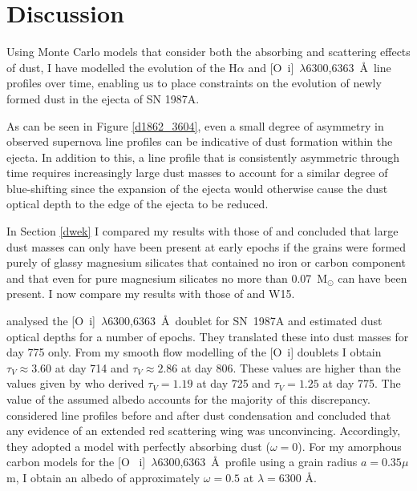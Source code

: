 \section{Discussion}
\label{discuss}

Using Monte Carlo models that consider both the absorbing and scattering 
effects of dust, I have modelled the evolution of the H$\alpha$ and 
[O~{\sc i}]~$\lambda$6300,6363~\AA\ line profiles over time, enabling us 
to place constraints on the evolution of newly formed dust in the ejecta 
of SN 1987A.

As can be seen in Figure \ref{d1862_3604}, even a small degree of 
asymmetry in observed supernova line profiles can be indicative of dust 
formation within the ejecta.  In addition to this, a line profile that is 
consistently asymmetric through time requires increasingly large dust 
masses to account for a similar degree of blue-shifting since the 
expansion of the ejecta would otherwise cause the dust optical depth to 
the edge of the ejecta to be reduced.

In Section \ref{dwek} I compared my results with those of \citet{Dwek2015} and 
concluded that large dust masses can only have been present at early 
epochs if the grains were formed purely of glassy magnesium silicates that 
contained no iron or carbon component and that even for pure magnesium 
silicates no more than 0.07~M$_\odot$ can have been present. I now 
compare my results with those of \citet{Lucy1989} and W15.

\citet{Lucy1989} analysed the [O~{\sc i}]~$\lambda$6300,6363~\AA\ doublet 
for SN~1987A and estimated dust optical depths for a number of epochs. 
They translated these into dust masses for day 775 only. From my smooth 
flow modelling of the [O~{\sc i}] doublets I obtain $\tau_V \approx 3.60$ at day 
714 and $\tau_V \approx 2.86$ at day 806.  These values are higher 
than the values given by \citet{Lucy1989} who derived $\tau_V=1.19$ at day 
725 and $\tau_V=1.25$ at day 775.  The value of the assumed albedo 
accounts for the majority of this discrepancy.  \citet{Lucy1989} 
considered line profiles before and after dust condensation and concluded 
that any evidence of an extended red scattering wing was unconvincing.  
Accordingly, they adopted a model with perfectly absorbing dust ($\omega = 
0$).  For my amorphous carbon models for the [O~{\sc 
i}]~$\lambda$6300,6363~\AA\ profile using a grain radius $a=0.35\mu$m, I 
obtain an albedo of approximately $\omega = 0.5$ at $\lambda=6300$ \AA.

